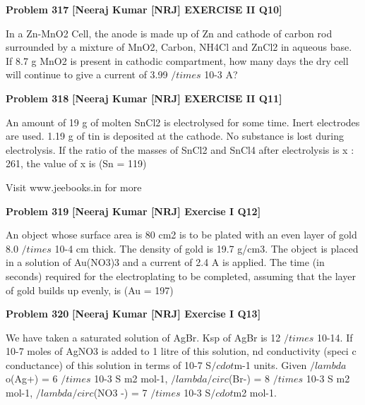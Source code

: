\begin{problembox}
\textbf{Problem 317} \hfill \textbf{[Neeraj Kumar [NRJ] EXERCISE II Q10]}
\label{q:ext-nrj_all_questions-317}

In a Zn-MnO2 Cell, the anode is made up of 
Zn and cathode of carbon rod surrounded by a 
mixture of MnO2, Carbon, NH4Cl and ZnCl2 in 
aqueous base. If 8.7 g MnO2 is present in cathodic 
compartment, how many days the dry cell will 
continue to give a current of 3.99 $/times$ 10-3 A?
\end{problembox}

\begin{problembox}
\textbf{Problem 318} \hfill \textbf{[Neeraj Kumar [NRJ] EXERCISE II Q11]}
\label{q:ext-nrj_all_questions-318}

An amount of 19 g of molten SnCl2 is electrolysed 
for some time. Inert electrodes are used. 1.19 g of 
tin is deposited at the cathode. No substance is 
lost during electrolysis. If the ratio of the masses 
of SnCl2 and SnCl4 after electrolysis is x : 261, the 
value of x is (Sn = 119)
 
 
Visit www.jeebooks.in for more
\end{problembox}

\begin{problembox}
\textbf{Problem 319} \hfill \textbf{[Neeraj Kumar [NRJ] Exercise I Q12]}
\label{q:ext-nrj_all_questions-319}

An object whose surface area is 80 cm2 is to be 
plated with an even layer of gold 8.0 $/times$ 10-4 cm 
thick. The density of gold is 19.7  g/cm3. The 
object is placed in a solution of Au(NO3)3 and a 
current of 2.4 A is applied. The time (in seconds) 
required for the electroplating to be completed, 
assuming that the layer of gold builds up evenly, is 
(Au = 197)
\end{problembox}

\begin{problembox}
\textbf{Problem 320} \hfill \textbf{[Neeraj Kumar [NRJ] Exercise I Q13]}
\label{q:ext-nrj_all_questions-320}

We have taken a saturated solution of AgBr. Ksp 
of AgBr is 12 $/times$ 10-14. If 10-7 moles of AgNO3 is 
added to 1 litre of this solution,   nd conductivity 
(speci  c conductance) of this solution in terms of 
10-7 S$/cdot$m-1 units. Given $/lambda$o(Ag+) = 6 $/times$ 10-3 S m2 
mol-1, $/lambda$$/circ$(Br-) = 8 $/times$ 10-3 S m2 mol-1, $/lambda$$/circ$(NO3
-) = 
7 $/times$ 10-3 S$/cdot$m2 mol-1.
\end{problembox}

